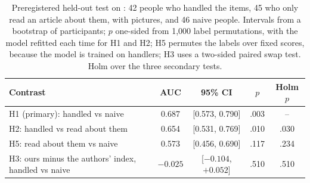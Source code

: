 \begin{table}[!htbp]
\caption{Preregistered held-out test on \citet{vandercruyssen2024jarmac}: 42 people who handled the items, 45 who only read an article about them, with pictures, and 46 naive people. Intervals from a bootstrap of participants; $p$ one-sided from 1,000 label permutations, with the model refitted each time for H1 and H2; H5 permutes the labels over fixed scores, because the model is trained on handlers; H3 uses a two-sided paired swap test. Holm over the three secondary tests.}\label{tab:heldout}
\footnotesize
\begin{tabular}{@{}lcccc@{}}
\toprule
Contrast & AUC & 95\% CI & $p$ & Holm $p$ \\
\midrule
H1 (primary): handled vs naive & 0.687 & [0.573, 0.790] & .003 & -- \\
H2: handled vs read about them & 0.654 & [0.531, 0.769] & .010 & .030 \\
H5: read about them vs naive & 0.573 & [0.456, 0.690] & .117 & .234 \\
H3: ours minus the authors' index, handled vs naive & $-0.025$ & [$-0.104$, $+0.052$] & .510 & .510 \\
\bottomrule
\end{tabular}
\end{table}
